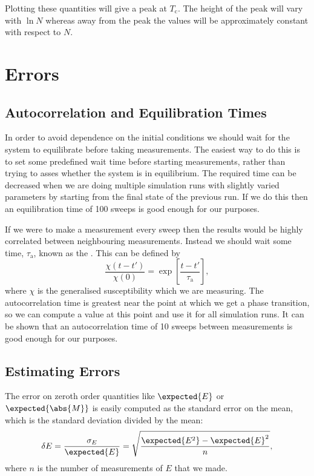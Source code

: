 \documentclass[fleqn]{NotesClass}
\begin{document}
    Plotting these quantities will give a peak at \(T_{\mathrm{c}}\).
    The height of the peak will vary with \(\ln N\) whereas away from the peak the values will be approximately constant with respect to \(N\).
    
    \section{Errors}
    \subsection{Autocorrelation and Equilibration Times}
    In order to avoid dependence on the initial conditions we should wait for the system to equilibrate before taking measurements.
    The easiest way to do this is to set some predefined wait time before starting measurements, rather than trying to asses whether the system is in equilibrium.
    The required time can be decreased when we are doing multiple simulation runs with slightly varied parameters by starting from the final state of the previous run.
    If we do this then an equilibration time of 100 sweeps is good enough for our purposes.
    
    If we were to make a measurement every sweep then the results would be highly correlated between neighbouring measurements.
    Instead we should wait some time, \(\tau_{\mathrm{a}}\), known as the .
    This can be defined by
    \begin{equation}
        \frac{\chi(t - t')}{\chi(0)} = \exp\left[ \frac{t - t'}{\tau_{\mathrm{a}}} \right],
    \end{equation}
    where \(\chi\) is the generalised susceptibility which we are measuring.
    The autocorrelation time is greatest near the point at which we get a phase transition, so we can compute a value at this point and use it for all simulation runs.
    It can be shown that an autocorrelation time of 10 sweeps between measurements is good enough for our purposes.
    
    \subsection{Estimating Errors}
    The error on zeroth order quantities like \(\expected{E}\) or \(\expected{\abs{M}}\) is easily computed as the standard error on the mean, which is the standard deviation divided by the mean:
    \begin{equation}
        \delta E = \frac{\sigma_{E}}{\expected{E}} = \sqrt{\frac{\expected{E^2} - \expected{E}^2}{n}},
    \end{equation}
    where \(n\) is the number of measurements of \(E\) that we made.
    
\end{document}
